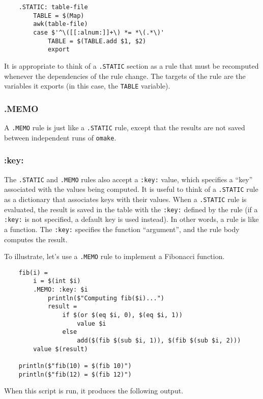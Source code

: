 \begin{verbatim}
    .STATIC: table-file
        TABLE = $(Map)
        awk(table-file)
        case $'^\([[:alnum:]]+\) *= *\(.*\)'
            TABLE = $(TABLE.add $1, $2)
            export
\end{verbatim}

It is appropriate to think of a \verb+.STATIC+ section as a rule that must be recomputed whenever
the dependencies of the rule change.  The targets of the rule are the variables it exports (in this
case, the \verb+TABLE+ variable).

\subsubsection{.MEMO}
\label{section:.MEMO}

A \verb+.MEMO+ rule is just like a \verb+.STATIC+ rule, except that the results are not saved
between independent runs of \verb+omake+.

\subsubsection{:key:}

The \verb+.STATIC+ and \verb+.MEMO+ rules also accept a \verb+:key:+ value, which specifies a
``key'' associated with the values being computed.  It is useful to think of a \verb+.STATIC+ rule
as a dictionary that associates keys with their values.  When a \verb+.STATIC+ rule is evaluated,
the result is saved in the table with the \verb+:key:+ defined by the rule (if a \verb+:key:+ is not
specified, a default key is used instead).  In other words, a rule is like a function.  The
\verb+:key:+ specifies the function ``argument'', and the rule body computes the result.

To illustrate, let's use a \verb+.MEMO+ rule to implement a Fibonacci function.

\begin{verbatim}
    fib(i) =
        i = $(int $i)
        .MEMO: :key: $i
            println($"Computing fib($i)...")
            result =
                if $(or $(eq $i, 0), $(eq $i, 1))
                    value $i
                else
                    add($(fib $(sub $i, 1)), $(fib $(sub $i, 2)))
        value $(result)

    println($"fib(10) = $(fib 10)")
    println($"fib(12) = $(fib 12)")
\end{verbatim}
%
When this script is run, it produces the following output.

